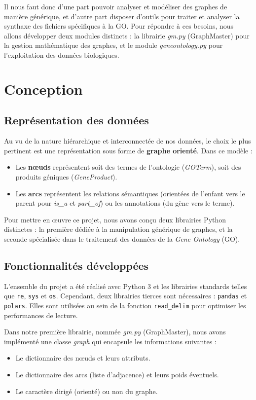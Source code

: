 \documentclass[12pt,a4paper]{article}
\begin{document}
Il nous faut donc d'une part pouvoir analyser et modéliser des graphes de manière générique, et d'autre part disposer d'outils pour traiter et analyser la synthaxe des fichiers spécifiques à la GO. Pour répondre à ces besoins, nous allons développer deux modules distincts : la librairie \textit{gm.py} (GraphMaster) pour la gestion mathématique des graphes, et le module \textit{geneontology.py} pour l'exploitation des données biologiques.

\section{Conception}

\subsection{Représentation des données}
Au vu de la nature hiérarchique et interconnectée de nos données, le choix le plus pertinent est une représentation sous forme de \textbf{graphe orienté}.
Dans ce modèle :
\begin{itemize}
    \item Les \textbf{nœuds} représentent soit des termes de l'ontologie (\textit{GOTerm}), soit des produits géniques (\textit{GeneProduct}).
    \item Les \textbf{arcs} représentent les relations sémantiques (orientées de l'enfant vers le parent pour \textit{is\_a} et \textit{part\_of}) ou les annotations (du gène vers le terme).
\end{itemize}

Pour mettre en œuvre ce projet, nous avons conçu deux librairies Python distinctes : la première dédiée à la manipulation générique de graphes, et la seconde spécialisée dans le traitement des données de la \textit{Gene Ontology} (GO).

\subsection{Fonctionnalités développées}
L'ensemble du projet a été réalisé avec Python 3 et les librairies standards telles que \texttt{re}, \texttt{sys} et \texttt{os}. Cependant, deux librairies tierces sont nécessaires : \texttt{pandas} et \texttt{polars}. Elles sont utilisées au sein de la fonction \texttt{read\_delim} pour optimiser les performances de lecture.

Dans notre première librairie, nommée \textit{gm.py} (GraphMaster), nous avons implémenté une classe \textit{graph} qui encapsule les informations suivantes :
\begin{itemize}
    \item Le dictionnaire des nœuds et leurs attributs.
    \item Le dictionnaire des arcs (liste d'adjacence) et leurs poids éventuels.
    \item Le caractère dirigé (orienté) ou non du graphe.
\end{itemize}
\end{document}
